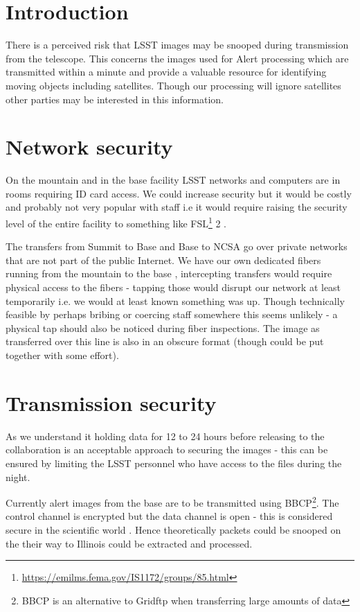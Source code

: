 \section{Introduction} \label{sec:intro}


There is a perceived  risk that LSST  images may be snooped during transmission from the telescope. This concerns the images used for Alert processing which are transmitted within a minute and provide a valuable resource for identifying moving objects including satellites. Though our processing will ignore satellites other parties may be interested in this information.

\section{Network security}\label{sec:net}

On the mountain and in the base facility LSST networks and computers are in rooms requiring ID card access.
We could increase security but it would be costly and probably not very popular with staff i.e it would require raising the security level of the entire facility to something like FSL\footnote{\url{https://emilms.fema.gov/IS1172/groups/85.html}} 2 .

The transfers from Summit to Base and Base to NCSA go over private networks that are not part of the public Internet. We have our own dedicated fibers running from the mountain to the base ,
intercepting transfers would require physical access to the fibers - tapping those would disrupt our network at least temporarily i.e. we would at least known something was up.  Though technically feasible by perhaps bribing or coercing staff somewhere this seems unlikely - a physical tap should also be noticed during fiber inspections.  The image as transferred over this line is also in an obscure format (though could be put together with some effort).


\section{Transmission security} \label{sec:trans}
As we understand it holding data for 12 to 24 hours before releasing to the collaboration is an acceptable approach to securing the images - this can be ensured by limiting the LSST personnel who have access to the files during the night.

Currently alert images from the base are to be transmitted using BBCP\footnote{BBCP is an alternative to Gridftp when transferring large amounts of data}. The control channel is encrypted but the data channel is open - this is considered secure in the scientific world \citep{bbcp}. Hence theoretically packets could be snooped on the their way to Illinois could be extracted and processed.



